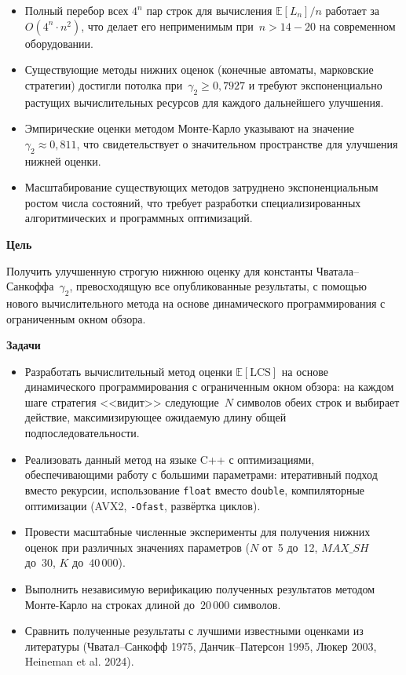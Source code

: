 \documentclass[12pt,a4paper]{article}
\begin{document}
\begin{itemize}[leftmargin=2em]
  \item Полный перебор всех $4^n$ пар строк для вычисления $\mathbb{E}[L_n]/n$ работает за $O(4^n \cdot n^2)$, что делает его неприменимым при~$n > 14{-}20$ на современном оборудовании.
  \item Существующие методы нижних оценок (конечные автоматы, марковские стратегии) достигли потолка при~$\gamma_2 \geq 0{,}7927$ и требуют экспоненциально растущих вычислительных ресурсов для каждого дальнейшего улучшения.
  \item Эмпирические оценки методом Монте-Карло указывают на значение $\gamma_2 \approx 0{,}811$, что свидетельствует о значительном пространстве для улучшения нижней оценки.
  \item Масштабирование существующих методов затруднено экспоненциальным ростом числа состояний, что требует разработки специализированных алгоритмических и программных оптимизаций.
\end{itemize}

\bigskip

\textbf{\large Цель}

\medskip
Получить улучшенную строгую нижнюю оценку для константы Чватала--Санкоффа~$\gamma_2$, превосходящую все опубликованные результаты, с помощью нового вычислительного метода на основе динамического программирования с ограниченным окном обзора.

\bigskip

\textbf{\large Задачи}

\begin{itemize}[leftmargin=2em]
  \item Разработать вычислительный метод оценки $\mathbb{E}[\mathrm{LCS}]$ на основе динамического программирования с ограниченным окном обзора: на каждом шаге стратегия <<видит>> следующие~$N$ символов обеих строк и выбирает действие, максимизирующее ожидаемую длину общей подпоследовательности.
  \item Реализовать данный метод на языке C++ с оптимизациями, обеспечивающими работу с большими параметрами: итеративный подход вместо рекурсии, использование \texttt{float} вместо \texttt{double}, компиляторные оптимизации (AVX2, \texttt{-Ofast}, развёртка циклов).
  \item Провести масштабные численные эксперименты для получения нижних оценок при различных значениях параметров ($N$ от~5 до~12, $\mathit{MAX\_SH}$ до~30, $K$ до~$40\,000$).
  \item Выполнить независимую верификацию полученных результатов методом Монте-Карло на строках длиной до~$20\,000$ символов.
  \item Сравнить полученные результаты с лучшими известными оценками из литературы (Чватал--Санкофф 1975, Данчик--Патерсон 1995, Люкер 2003, Heineman et al. 2024).
\end{itemize}
\end{document}
